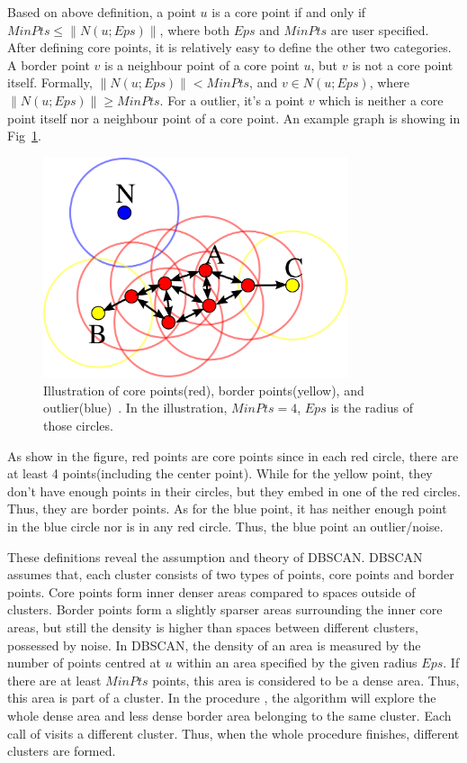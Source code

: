 Based on above definition, a point $u$ is a core point if and only if $MinPts \leq \|N(u;Eps)\|$, where both $Eps$ and $MinPts$ are user specified. After defining core points, it is relatively easy to define the other two categories. A border point $v$ is a neighbour point of a core point $u$, but $v$ is not a core point itself. Formally, $\|N(u;Eps)\| < MinPts$, and $v \in N(u;Eps)$, where $\|N(u;Eps)\| \geq MinPts$. For a outlier, it's a point $v$ which is neither a core point itself nor a neighbour point of a core point. An example graph is showing in Fig~\ref{fig:DBSCANConcept}.

\begin{figure}[ht]
	\begin{center}
		\includegraphics[width=0.8\textwidth]{images/DBSCAN-Illustration.png}
		\caption{Illustration of core points(red), border points(yellow), and outlier(blue)~\cite{wiki:DBSCAN}. In the illustration, $MinPts = 4$, $Eps$ is the radius of those circles.}
		\label{fig:DBSCANConcept}
	\end{center}
\end{figure}

As show in the figure, red points are core points since in each red circle, there are at least 4 points(including the center point). While for the yellow point, they don't have enough points in their circles, but they embed in one of the red circles. Thus, they are border points. As for the blue point, it has neither enough point in the blue circle nor is in any red circle. Thus, the blue point an outlier/noise.

These definitions reveal the assumption and theory of DBSCAN. DBSCAN assumes that, each cluster consists of two types of points, core points and border points. Core points form inner denser areas compared to spaces outside of clusters. Border points form a slightly sparser areas surrounding the inner core areas, but still the density is higher than spaces between different clusters, possessed by noise. In DBSCAN, the density of an area is measured by the number of points centred at $u$ within an area specified by the given radius $Eps$. If there are at least $MinPts$ points, this area is considered to be a dense area. Thus, this area is part of a cluster. In the procedure , the algorithm will explore the whole dense area and less dense border area belonging to the same cluster. Each call of  visits a different cluster. Thus, when the whole procedure  finishes, different clusters are formed.

